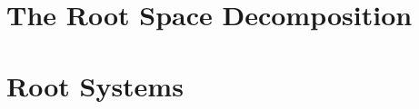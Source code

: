 \section{The Root Space Decomposition}


































\section{Root Systems}














